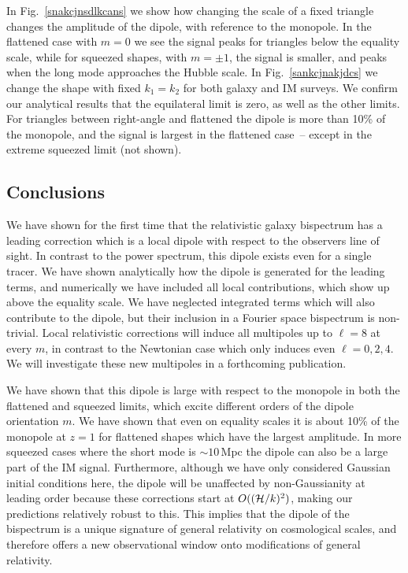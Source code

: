 In Fig.~\eqref{snakcjnsdlkcans} we show how changing the scale of a fixed triangle changes the amplitude of the dipole, with reference to the monopole. In the flattened case with $m=0$ we see the signal peaks for triangles below the equality scale, while for squeezed shapes, with $m=\pm1$, the signal is smaller, and peaks when the long mode approaches the Hubble scale. 
In Fig.~\eqref{sankcjnakjdcs} we change the shape with fixed $k_1=k_2$ for both galaxy and IM surveys. We confirm our analytical results that the equilateral limit is zero, as well as the other limits. For triangles between right-angle and flattened the dipole is more than 10\% of the monopole, and the signal is largest in the flattened case~-- except in the extreme squeezed limit (not shown). 


\subsection*{Conclusions}

We have shown for the first time that the relativistic galaxy bispectrum has a leading correction which is a local dipole with respect to the observers line of sight. In contrast to the power spectrum, this dipole exists even for a single tracer. We have shown analytically how the dipole is generated for the leading terms, and numerically we have included all local contributions, which show up above the equality scale. We have neglected integrated terms which will also contribute to the dipole, but their inclusion in a Fourier space bispectrum is non-trivial. Local relativistic corrections will induce all multipoles up to $\ell=8$ at every $m$, in contrast to the Newtonian case which only induces even $\ell=0,2,4$. We will investigate these new multipoles in a forthcoming publication. 

We have shown that this dipole is large with respect to the monopole in both the flattened and squeezed limits, which excite different orders of the dipole orientation $m$.  We have shown that even on equality scales it is about 10\% of the monopole at $z=1$ for flattened shapes which have the largest amplitude. In more squeezed cases where the short mode is $\sim10$\,Mpc the dipole can also be a large part of the IM signal. Furthermore, although we have only considered Gaussian initial conditions here, the dipole will be unaffected by non-Gaussianity at leading order because these corrections start at $O((\mathcal{H}/k)^2)$, making our predictions relatively robust to this. This implies that the dipole of the bispectrum is a unique signature of general relativity on cosmological scales, and therefore offers a new observational window onto modifications of general relativity. 




